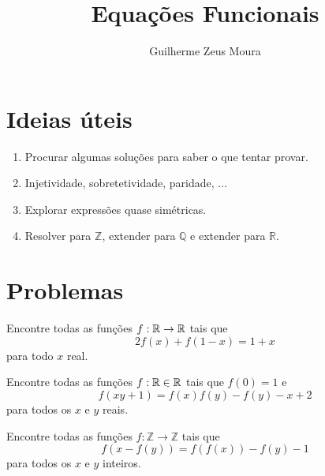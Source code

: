 \documentclass[10pt,a4paper]{article}
\title{Equações Funcionais}
\author{Guilherme Zeus Moura}
\begin{document}
	
	\sloppy

	\twocolumn[\zeustitle]

	\section*{Ideias úteis}
	\begin{enumerate}[label = {(\alph*)}]
		\item Procurar algumas soluções para saber o que tentar provar.
		\item Injetividade, sobretetividade, paridade, $\dots$
		\item Explorar expressões quase simétricas.
		\item Resolver para $\mathbb{Z}$, extender para $\mathbb{Q}$ e extender para $\mathbb{R}$.
	\end{enumerate}
	\section*{Problemas}
	\begin{prob}
		Encontre todas as funções $f: \mathbb{R} \to \mathbb{R}$ tais que
		$$ 2f(x) + f(1-x) = 1 + x$$
		para todo $x$ real.
	\end{prob}
	\begin{prob}
		Encontre todas as funções $f: \mathbb{R} \in \mathbb{R}$ tais que $f(0) = 1$ e
		$$ f(xy + 1) = f(x)f(y) - f(y) - x + 2$$
		para todos os $x$ e $y$ reais.
	\end{prob}
	\begin{prob}
		Encontre todas as funções $f: \mathbb{Z} \to \mathbb{Z}$ tais que
		$$ f(x - f(y)) = f(f(x)) - f(y) - 1$$
		para todos os $x$ e $y$ inteiros.
	\end{prob}
\end{document}

